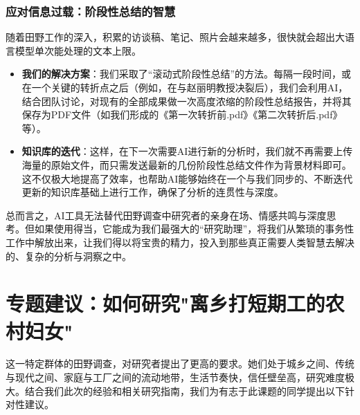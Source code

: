 \documentclass[UTF8]{ctexart}
\begin{document}
\subsubsection{应对信息过载：阶段性总结的智慧}
随着田野工作的深入，积累的访谈稿、笔记、照片会越来越多，很快就会超出大语言模型单次能处理的文本上限。
\begin{itemize}
    \item \textbf{我们的解决方案}：我们采取了“滚动式阶段性总结”的方法。每隔一段时间，或在一个关键的转折点之后（例如，在与赵丽明教授决裂后），我们会利用AI，结合团队讨论，对现有的全部成果做一次高度浓缩的阶段性总结报告，并将其保存为PDF文件（如我们形成的《第一次转折前.pdf》《第二次转折后.pdf》等）。
    \item \textbf{知识库的迭代}：这样，在下一次需要AI进行新的分析时，我们就不再需要上传海量的原始文件，而只需发送最新的几份阶段性总结文件作为背景材料即可。这不仅极大地提高了效率，也帮助AI能够始终在一个与我们同步的、不断迭代更新的知识库基础上进行工作，确保了分析的连贯性与深度。
\end{itemize}
总而言之，AI工具无法替代田野调查中研究者的亲身在场、情感共鸣与深度思考。但如果使用得当，它能成为我们最强大的“研究助理”，将我们从繁琐的事务性工作中解放出来，让我们得以将宝贵的精力，投入到那些真正需要人类智慧去解决的、复杂的分析与洞察之中。
\newpage

\section{专题建议：如何研究"离乡打短期工的农村妇女"}

这一特定群体的田野调查，对研究者提出了更高的要求。她们处于城乡之间、传统与现代之间、家庭与工厂之间的流动地带，生活节奏快，信任壁垒高，研究难度极大。结合我们此次的经验和相关研究指南，我们为有志于此课题的同学提出以下针对性建议。
\end{document}
